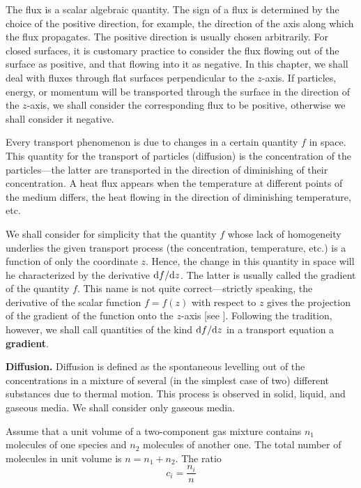 The flux is a scalar algebraic quantity. The sign of a flux is determined by the choice of the positive direction, for example, the direction of the axis along which the flux propagates. The positive direction is usually chosen arbitrarily. For closed surfaces, it is customary practice to consider the flux flowing out of the surface as positive, and that flowing into it as negative. In this chapter, we shall deal with fluxes through flat surfaces perpendicular to the $z$-axis. If particles, energy, or momentum will be transported through the surface in the direction of the $z$-axis, we shall consider the corresponding flux to be positive, otherwise we shall consider it negative.

Every transport phenomenon is due to changes in a certain quantity $f$ in space. This quantity for the transport of particles (diffusion) is the concentration of the particles---the latter are transported in the direction of diminishing of their concentration. A heat flux appears when the temperature at different points of the medium differs, the heat flowing in the direction of diminishing temperature, etc.

We shall consider for simplicity that the quantity $f$ whose lack of homogeneity underlies the given transport process (the concentration, temperature, etc.) is a function of only the coordinate $z$. Hence, the change in this quantity in space will he characterized by the derivative $\mathrm{d} f/\mathrm{d} z$. The latter is usually called the gradient of the quantity $f$. This name is not quite correct---strictly speaking, the derivative of the scalar function $f=f(z)$ with respect to $z$ gives the projection of the gradient of the function onto the $z$-axis [see ]. Following the tradition, however, we shall call quantities of the kind $\mathrm{d} f/\mathrm{d} z$ in a transport equation a \textbf{gradient}.

\textbf{Diffusion.} Diffusion is defined as the spontaneous levelling out of the concentrations in a mixture of several (in the simplest case of two) different substances due to thermal motion. This process is observed in solid, liquid, and gaseous media. We shall consider only gaseous media.

Assume that a unit volume of a two-component gas mixture contains $n_1$ molecules of one species and $n_2$ molecules of another one. The total number of molecules in unit volume is $n=n_1+n_2$. The ratio
\begin{equation*}
    c_i = \frac{n_i}{n}
\end{equation*}

